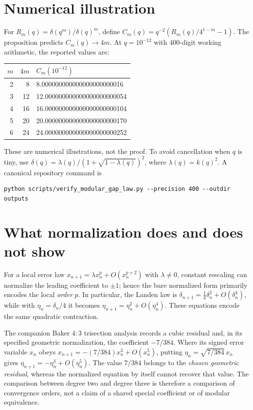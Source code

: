 \documentclass[11pt]{article}
\begin{document}
\section{Numerical illustration}
For $R_m(q)=\delta(q^m)/\delta(q)^m$, define $C_m(q)=q^{-2}(R_m(q)/4^{1-m}-1)$. The proposition predicts $C_m(q)\to4m$. At $q=10^{-12}$ with 400-digit working arithmetic, the reported values are:
\begin{center}\begin{tabular}{rrl}\toprule
$m$&$4m$&$C_m(10^{-12})$\\\midrule
2&8&8.000000000000000000000016\\
3&12&12.000000000000000000000054\\
4&16&16.000000000000000000000104\\
5&20&20.000000000000000000000170\\
6&24&24.000000000000000000000252\\\bottomrule
\end{tabular}\end{center}
These are numerical illustrations, not the proof. To avoid cancellation when $q$ is tiny, use $\delta(q)=\lambda(q)/(1+\sqrt{1-\lambda(q)})^2$, where $\lambda(q)=k(q)^2$. A canonical repository command is
\begin{center}
\begin{minipage}{0.92\linewidth}
\begin{verbatim}
python scripts/verify_modular_gap_law.py --precision 400 --outdir outputs
\end{verbatim}
\end{minipage}
\end{center}

\section{What normalization does and does not show}
For a local error law $x_{n+1}=\lambda x_n^p+O(x_n^{p+2})$ with $\lambda\ne0$, constant rescaling can normalize the leading coefficient to $\pm1$; hence the bare normalized form primarily encodes the local \emph{order} $p$. In particular, the Landen law is $\delta_{n+1}=\tfrac14\delta_n^2+O(\delta_n^4)$, while with $\eta_n=\delta_n/4$ it becomes $\eta_{n+1}=\eta_n^2+O(\eta_n^4)$. These equations encode the same quadratic contraction.

The companion Baker $4{:}3$ trisection analysis records a cubic residual and, in its specified geometric normalization, the coefficient $-7/384$. Where its signed error variable $x_n$ obeys $x_{n+1}=-(7/384)x_n^3+O(x_n^5)$, putting $\eta_n=\sqrt{7/384}\,x_n$ gives $\eta_{n+1}=-\eta_n^3+O(\eta_n^5)$. The value $7/384$ belongs to the \emph{chosen geometric residual}, whereas the normalized equation by itself cannot recover that value. The comparison between degree two and degree three is therefore a comparison of convergence orders, not a claim of a shared special coefficient or of modular equivalence.
\end{document}
